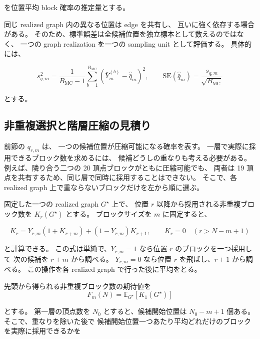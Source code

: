 \documentclass[a4j,10pt]{ujarticle}
\begin{document}
を位置平均 block 確率の推定量とする。

同じ realized graph 内の異なる位置は edge を共有し、
互いに強く依存する場合がある。
そのため、標準誤差は全候補位置を独立標本として数えるのではなく、
一つの graph realization を一つの sampling unit として評価する。
具体的には、

\[
s_{q,m}^2
=
\frac{1}{B_{\mathrm{MC}}-1}
\sum_{b=1}^{B_{\mathrm{MC}}}
\left(\bar Y_m^{(b)}-\widehat{\bar q}_m\right)^2,
\qquad
\mathrm{SE}(\widehat{\bar q}_m)
=
\frac{s_{q,m}}{\sqrt{B_{\mathrm{MC}}}}
\]

とする。


\subsection{非重複選択と階層圧縮の見積り}
\label{subsec:hierarchical_model}

前節の $q_{r,m}$ は、
一つの候補位置が圧縮可能になる確率を表す。
一層で実際に採用できるブロック数を求めるには、
候補どうしの重なりも考える必要がある。
例えば、隣り合う二つの 20 頂点ブロックがともに圧縮可能でも、
両者は 19 頂点を共有するため、同じ層で同時に採用することはできない。
そこで、各 realized graph 上で重ならないブロックだけを左から順に選ぶ。

固定した一つの realized graph $G^\star$ 上で、
位置 $r$ 以降から採用される非重複ブロック数を $K_r(G^\star)$ とする。
ブロックサイズを $m$ に固定すると、

\begin{equation}
K_r
=
Y_{r,m}(1+K_{r+m})
+
(1-Y_{r,m})K_{r+1},
\qquad
K_r=0\quad(r>N-m+1)
\label{eq:nonoverlap_dp_ch5}
\end{equation}

と計算できる。
この式は単純で、$Y_{r,m}=1$ なら位置 $r$ のブロックを一つ採用して
次の候補を $r+m$ から調べる。
$Y_{r,m}=0$ なら位置 $r$ を飛ばし、$r+1$ から調べる。
この操作を各 realized graph で行った後に平均をとる。

先頭から得られる非重複ブロック数の期待値を
\begin{equation}
F_m(N)
=
\mathbb E_{G^\star}[K_1(G^\star)]
\label{eq:F_block_ch5}
\end{equation}

とする。
第一層の頂点数を $N_0$ とすると、候補開始位置は $N_0-m+1$ 個ある。
そこで、重なりを除いた後で
候補開始位置一つあたり平均どれだけのブロックを実際に採用できるかを
\end{document}
